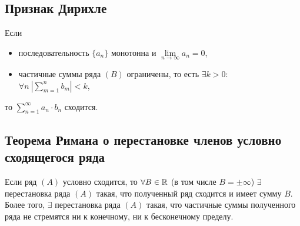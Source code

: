 \subsection{Признак Дирихле}

\begin{theorem}
    Если \begin{itemize}
        \item последовательность $\{a_n\}$ монотонна и $\underset{n\rightarrow\infty}{\lim}a_n = 0$,
        \item частичные суммы ряда $(B)$ ограничены, то есть $\exists k > 0: $ \\ $ \forall n \ \left|\sum_{m=1}^{n} b_m\right|< k$,
    \end{itemize}
    то $\sum_{n=1}^{\infty}a_n \cdot b_n$ сходится.
\end{theorem}

\subsection{Теорема Римана о перестановке членов условно сходящегося ряда}

\begin{theorem}
    Если ряд $(A)$ условно сходится, то $\forall B \in \mathbb{R}$ (в том числе $B = \pm\infty$) $\exists$ перестановка ряда $(A)$ такая, что полученный ряд сходится и имеет сумму $B$. Более того, $\exists$ перестановка ряда $(A)$ такая, что частичные суммы полученного ряда не стремятся ни к конечному, ни к бесконечному пределу.
\end{theorem}

\newpage
